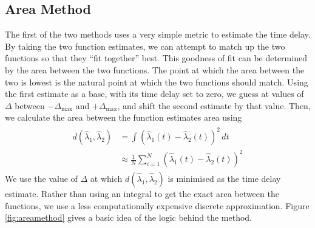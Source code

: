 \documentclass[a4paper,11pt]{article}
\begin{document}
\subsection{Area Method}
\label{sec-7-1}

   The first of the two methods uses a very simple metric to estimate the time
   delay. By taking the two function estimates, we can attempt to match up the two
   functions so that they ``fit together'' best. This goodness of fit can be
   determined by the area between the two functions. The point at which the area
   between the two is lowest is the natural point at which the two functions should
   match. Using the first estimate as a base, with its time delay set to zero, we
   guess at values of $\Delta$ between $-\Delta_{\text{max}}$ and
   $+\Delta_{\text{max}}$, and shift the second estimate by that value. Then, we
   calculate the area between the function estimates area using
   \begin{align}
   \begin{split}
   d(\hat{\lambda}_1,\hat{\lambda}_2)&=\int(\hat{\lambda}_1(t)-\hat{\lambda}_2(t))^2\,dt\\
   &\approx\frac{1}{N}\sum_{i=1}^N(\hat{\lambda}_1(t)-\hat{\lambda}_2(t))^2
   \end{split}
   \end{align}
   We use the value of $\Delta$ at which $d(\hat{\lambda}_1,\hat{\lambda}_2)$ is
   minimised as the time delay estimate. Rather than using an integral to get the
   exact area between the functions, we use a less computationally expensive
   discrete approximation. Figure \ref{fig:areamethod} gives a basic idea of the
   logic behind the method.
\end{document}
